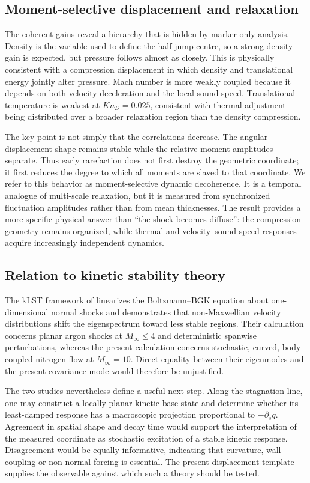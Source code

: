 \documentclass[paper]{JFM-FLM_Au}
\newcommand{\KnD}{Kn_D}
\newcommand{\mean}[1]{\overline{#1}}
\begin{document}
\subsection{Moment-selective displacement and relaxation}
The coherent gains reveal a hierarchy that is hidden by marker-only analysis. Density is the variable used to define the half-jump centre, so a strong density gain is expected, but pressure follows almost as closely. This is physically consistent with a compression displacement in which density and translational energy jointly alter pressure. Mach number is more weakly coupled because it depends on both velocity deceleration and the local sound speed. Translational temperature is weakest at $\KnD=0.025$, consistent with thermal adjustment being distributed over a broader relaxation region than the density compression.

The key point is not simply that the correlations decrease. The angular displacement shape remains stable while the relative moment amplitudes separate. Thus early rarefaction does not first destroy the geometric coordinate; it first reduces the degree to which all moments are slaved to that coordinate. We refer to this behavior as moment-selective dynamic decoherence. It is a temporal analogue of multi-scale relaxation, but it is measured from synchronized fluctuation amplitudes rather than from mean thicknesses. The result provides a more specific physical answer than ``the shock becomes diffuse'': the compression geometry remains organized, while thermal and velocity--sound-speed responses acquire increasingly independent dynamics.

\subsection{Relation to kinetic stability theory}
The kLST framework of \citet{Karpuzcu2026} linearizes the Boltzmann--BGK equation about one-dimensional normal shocks and demonstrates that non-Maxwellian velocity distributions shift the eigenspectrum toward less stable regions. Their calculation concerns planar argon shocks at $M_\infty\leq4$ and deterministic spanwise perturbations, whereas the present calculation concerns stochastic, curved, body-coupled nitrogen flow at $M_\infty=10$. Direct equality between their eigenmodes and the present covariance mode would therefore be unjustified.

The two studies nevertheless define a useful next step. Along the stagnation line, one may construct a locally planar kinetic base state and determine whether its least-damped response has a macroscopic projection proportional to $-\partial_s\mean q$. Agreement in spatial shape and decay time would support the interpretation of the measured coordinate as stochastic excitation of a stable kinetic response. Disagreement would be equally informative, indicating that curvature, wall coupling or non-normal forcing is essential. The present displacement template supplies the observable against which such a theory should be tested.
\end{document}
